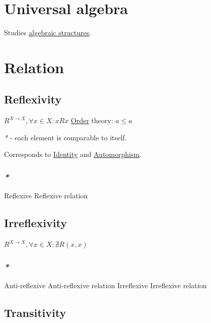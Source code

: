 \documentclass[a4paper,14pt,oneside]{book}
\begin{document}
\chapter{\label{orge34aa9a}Universal algebra}
\label{sec:org75beb8c}

Studies \hyperref[org5012c9f]{algebraic structures}.

\chapter{\label{org1c27de9}Relation}
\label{sec:org4ca0417}

\section{\label{org342d632}Reflexivity}
\label{sec:orga5e60d6}

\(R^{X \to X}, \forall x \in X : x R x\)
\hyperref[org346af6d]{Order} theory: \(a \le a\)

\emph{*} - each element is comparable to itself.

Corresponds to \hyperref[orgcacdac9]{Identity} and \hyperref[org688ff9f]{Automorphism}.

\subsection{\emph{*}}
\label{sec:orgfa39a0e}

\label{orgd7aac37}Reflexive
\label{orgf673093}Reflexive relation

\section{\label{org4fc7355}Irreflexivity}
\label{sec:org33bd07a}

\(R^{X \to X}, \forall x \in X : \nexists R(x, x)\)

\subsection{\emph{*}}
\label{sec:org47454b1}

\label{org4704283}Anti-reflexive
\label{org6d25350}Anti-reflexive relation
\label{orgdabd81a}Irreflexive
\label{orgbf73ba7}Irreflexive relation

\section{\label{org75d8405}Transitivity}
\label{sec:orged48cef}
\end{document}
